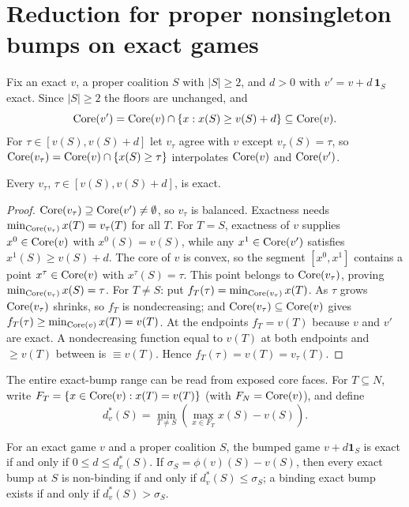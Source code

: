 \section{Reduction for proper nonsingleton bumps on exact games}\label{sec:lx-reduction}

Fix an exact $v$, a proper coalition $S$ with $|S|\ge 2$, and $d>0$ with
$v'=v+d\,\mathbf 1_S$ exact. Since $|S|\ge2$ the floors are unchanged, and
\[
  \operatorname{Core}(v')=\operatorname{Core}(v)\cap\{x:x(S)\ge v(S)+d\}\subseteq\operatorname{Core}(v).
\]
For $\tau\in[v(S),v(S)+d]$ let $v_\tau$ agree with $v$ except $v_\tau(S)=\tau$, so
$\operatorname{Core}(v_\tau)=\operatorname{Core}(v)\cap\{x(S)\ge\tau\}$ interpolates $\operatorname{Core}(v)$ and $\operatorname{Core}(v')$.

\begin{lemma}\label{lem:lx-interval}
Every $v_\tau$, $\tau\in[v(S),v(S)+d]$, is exact.
\end{lemma}

\begin{proof}
$\operatorname{Core}(v_\tau)\supseteq\operatorname{Core}(v')\neq\emptyset$, so $v_\tau$ is balanced.
Exactness needs $\min_{\operatorname{Core}(v_\tau)}x(T)=v_\tau(T)$ for all $T$.
For $T=S$, exactness of $v$ supplies $x^0\in\operatorname{Core}(v)$ with
$x^0(S)=v(S)$, while any $x^1\in\operatorname{Core}(v')$ satisfies
$x^1(S)\ge v(S)+d$. The core of $v$ is convex, so the segment
$[x^0,x^1]$ contains a point $x^\tau\in\operatorname{Core}(v)$ with $x^\tau(S)=\tau$.
This point belongs to $\operatorname{Core}(v_\tau)$, proving
$\min_{\operatorname{Core}(v_\tau)}x(S)=\tau$.
For $T\neq S$: put $f_T(\tau)=\min_{\operatorname{Core}(v_\tau)}x(T)$. As $\tau$ grows
$\operatorname{Core}(v_\tau)$ shrinks, so $f_T$ is nondecreasing; and $\operatorname{Core}(v_\tau)\subseteq
\operatorname{Core}(v)$ gives $f_T(\tau)\ge\min_{\operatorname{Core}(v)}x(T)=v(T)$. At the endpoints
$f_T=v(T)$ because $v$ and $v'$ are exact. A nondecreasing function equal to
$v(T)$ at both endpoints and $\ge v(T)$ between is $\equiv v(T)$. Hence
$f_T(\tau)=v(T)=v_\tau(T)$.
\end{proof}

The entire exact-bump range can be read from exposed core faces. For
$T\subseteq N$, write
$F_T=\{x\in\operatorname{Core}(v):x(T)=v(T)\}$ (with $F_N=\operatorname{Core}(v)$), and define
\[
 d^*_v(S)=\min_{T\neq S}
 \left(\max_{x\in F_T}x(S)-v(S)\right).
\]

\begin{proposition}\label{prop:lx-capacity}
For an exact game $v$ and a proper coalition $S$, the bumped game
$v+d\mathbf 1_S$ is exact if and only if $0\leq d\leq d^*_v(S)$.
If $\sigma_S=\phi(v)(S)-v(S)$, then every exact bump at $S$ is
non-binding if and only if $d^*_v(S)\leq\sigma_S$; a binding exact bump
exists if and only if $d^*_v(S)>\sigma_S$.
\end{proposition}


